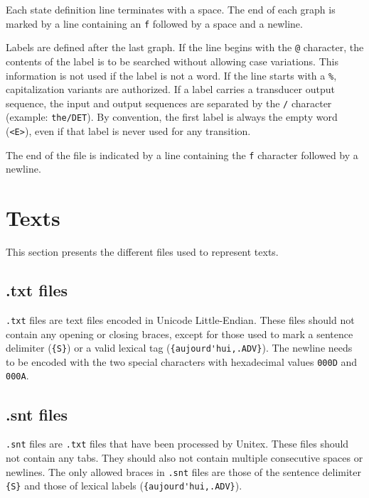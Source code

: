 \bigskip
\noindent Each state definition line terminates with a space. The end of each
graph is marked by a line containing an \verb+f+ followed by a space and a
newline.

\bigskip
\noindent Labels are defined after the last graph. If the line begins with the
\verb+@+ character, the contents of the label is to be searched without allowing
case variations. This information is not used if the label is not a word. If the
line starts with a \verb+%+, capitalization variants are authorized. If a label
carries a transducer output sequence, the input and output sequences are
separated by the \verb+/+  character (example: \verb+the/DET+). By convention,
the first label is always the empty word (\verb+<E>+), even if that label is
never used for any transition.

\bigskip
\noindent The end of the file is indicated by a line containing the \verb+f+
character followed by a newline.



\section{Texts}
This section presents the different files used to represent texts.
\subsection{.txt files}
\label{section-texts}
\verb+.txt+ files are text files encoded in Unicode Little-Endian. These files
should not contain any opening or closing braces, except for those used to mark a
sentence delimiter (\verb+{S}+) or a valid lexical tag
(\verb+{aujourd'hui,.ADV}+). The newline needs to be encoded with the two special
characters with hexadecimal values \verb+000D+ and \verb+000A+.


\subsection{.snt files}
\verb+.snt+ files are \verb+.txt+ files that have been processed by Unitex. These
files should not contain any tabs. They should also not contain multiple
consecutive spaces or newlines. The only allowed braces in \verb+.snt+ files are
those of the sentence delimiter \verb+{S}+ and those of lexical labels
(\verb+{aujourd'hui,.ADV}+).



